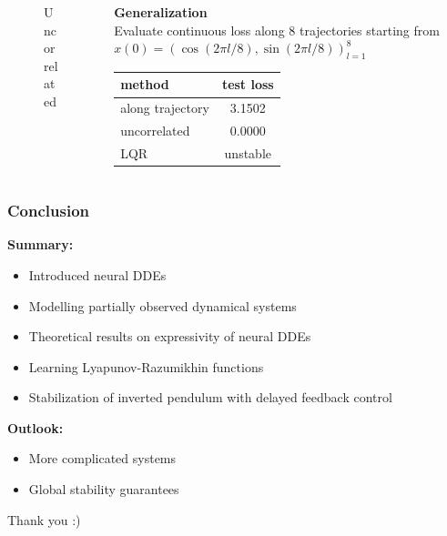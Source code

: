 \documentclass[11pt,aspectratio=169]{beamer}
\begin{document}
\begin{frame}
\begin{columns}[T]
\begin{column}{0.3\textwidth}
\begin{figure}[h!]
                 \caption{Uncorrelated}
             \end{figure}
        \end{column}
        \begin{column}[T]{0.4\textwidth}
        \textbf{Generalization}\\
        Evaluate continuous loss along 8 trajectories starting from
        $x(0)=(\cos(2\pi l/8), \sin(2\pi l/8))_{l=1}^8$
            \begin{center}
                \begin{tabular}{ l | c }
 method& test loss\\
 \hline
  along trajectory& 3.1502\\
  uncorrelated& 0.0000\\
  LQR& unstable
\end{tabular}
            \end{center}
        \end{column}
    \end{columns}
\end{frame}

\begin{frame}[t]
    \frametitle{Conclusion}
    \textbf{Summary:}
    \begin{itemize}
        \item Introduced neural DDEs
        \item Modelling partially observed dynamical systems
        \item Theoretical results on expressivity of neural DDEs
        \item Learning Lyapunov-Razumikhin functions
        \item Stabilization of inverted pendulum with delayed feedback control
    
    \end{itemize}
    \vspace{0.3cm}
    \textbf{Outlook:}
    \begin{itemize}
        \item More complicated systems
        \item Global stability guarantees
    \end{itemize}
\end{frame}

\begin{closingframe}
  \centering \Large
  Thank you :)
\end{closingframe}

\end{document}
